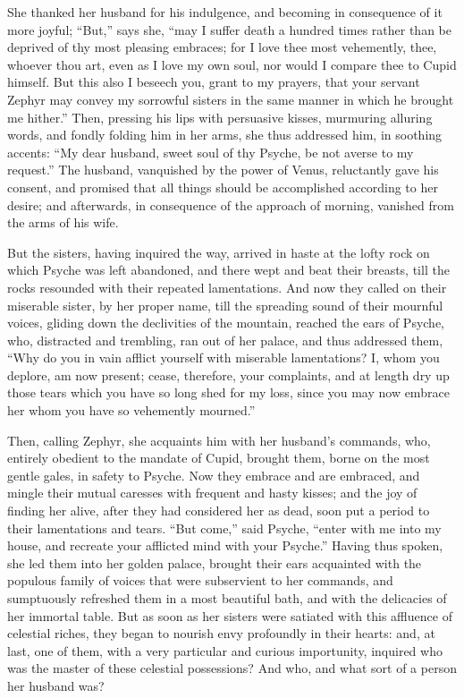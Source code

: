 \documentclass[12pt]{article}
\begin{document}
She thanked her husband for his indulgence, and becoming in consequence of it
more joyful; ``But,'' says she, ``may I suffer death a hundred times rather
than be deprived of thy most pleasing embraces; for I love thee most
vehemently, thee, whoever thou art, even as I love my own soul, nor would I
compare thee to Cupid himself. But this also I beseech you, grant to my
prayers, that your servant Zephyr may convey my sorrowful sisters in the same
manner in which he brought me hither.'' Then, pressing his lips with persuasive
kisses, murmuring alluring words, and fondly folding him in her arms, she thus
addressed him, in soothing accents: ``My dear husband, sweet soul of thy
Psyche, be not averse to my request.'' The husband, vanquished by the power of
Venus, reluctantly gave his consent, and promised that all things should be
accomplished according to her desire; and afterwards, in consequence of the
approach of morning, vanished from the arms of his wife.

But the sisters, having inquired the way, arrived in haste at the lofty rock on
which Psyche was left abandoned, and there wept and beat their breasts, till
the rocks resounded with their repeated lamentations. And now they called on
their miserable sister, by her proper name, till the spreading sound of their
mournful voices, gliding down the declivities of the mountain, reached the ears
of Psyche, who, distracted and trembling, ran out of her palace, and thus
addressed them, ``Why do you in vain afflict yourself with miserable
lamentations? I, whom you deplore, am now present; cease, therefore, your
complaints, and at length dry up those tears which you have so long shed for my
loss, since you may now embrace her whom you have so vehemently mourned.''

Then, calling Zephyr, she acquaints him with her husband's commands, who,
entirely obedient to the mandate of Cupid, brought them, borne on the most
gentle gales, in safety to Psyche. Now they embrace and are embraced, and
mingle their mutual caresses with frequent and hasty kisses; and the joy of
finding her alive, after they had considered her as dead, soon put a period to
their lamentations and tears. ``But come,'' said Psyche, ``enter with me into
my house, and recreate your afflicted mind with your Psyche.'' Having thus
spoken, she led them into her golden palace, brought their ears acquainted with
the populous family of voices that were subservient to her commands, and
sumptuously refreshed them in a most beautiful bath, and with the delicacies of
her immortal table. But as soon as her sisters were satiated with this
affluence of celestial riches, they began to nourish envy profoundly in their
hearts: and, at last, one of them, with a very particular and curious
importunity, inquired who was the master of these celestial possessions? And
who, and what sort of a person her husband was?
\end{document}
